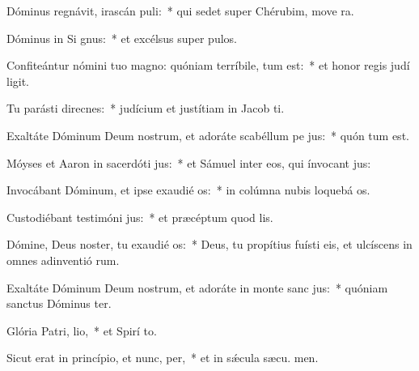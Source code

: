 \item Dóminus regnávit, irascán puli:~* qui sedet super Chérubim, move ra.
\item Dóminus in Si gnus:~* et excélsus super  pulos.
\item Confiteántur nómini tuo magno: quóniam terríbile,  tum est:~* et honor regis judí ligit.
\item Tu parásti direcnes:~* judícium et justítiam in Jacob  ti.
\item Exaltáte Dóminum Deum nostrum, et adoráte scabéllum pe jus:~* quón tum est.
\item Móyses et Aaron in sacerdóti jus:~* et Sámuel inter eos, qui ínvocant  jus:
\item Invocábant Dóminum, et ipse exaudié os:~* in colúmna nubis loquebá  os.
\item Custodiébant testimóni jus:~* et præcéptum quod  lis.
\item Dómine, Deus noster, tu exaudié os:~* Deus, tu propítius fuísti eis, et ulcíscens in omnes adinventió rum.
\item Exaltáte Dóminum Deum nostrum, et adoráte in monte sanc jus:~* quóniam sanctus Dóminus  ter.
\item Glória Patri,  lio,~* et Spirí to.
\item Sicut erat in princípio, et nunc,  per,~* et in sǽcula sæcu. men.
